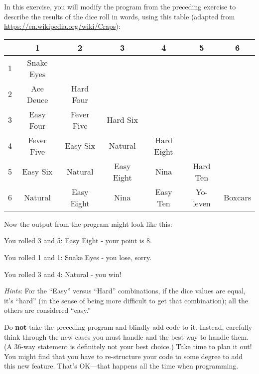 \begin{exercise}
In this exercise, you will modify the program from the preceding exercise to describe the results of the dice roll in words, using this table (adapted from \url{https://en.wikipedia.org/wiki/Craps}):

\begin{tabular}{|l|c|c|c|c|c|c|}
\hline
& 1 & 2 & 3 & 4 & 5 & 6 \\ \hline
1 & Snake Eyes & & & & & \\ \hline
2 & Ace Deuce & Hard Four & & & & \\ \hline
3 & Easy Four & Fever Five & Hard Six & & & \\ \hline
4 & Fever Five & Easy Six & Natural & Hard Eight & & \\ \hline
5 & Easy Six & Natural & Easy Eight & Nina & Hard Ten  & \\ \hline
6 & Natural & Easy Eight & Nina & Easy Ten & Yo-leven & Boxcars \\ \hline
\end{tabular}

Now the output from the program might look like this:

\begin{stdout}
You rolled 3 and 5: Easy Eight - your point is 8.

You rolled 1 and 1: Snake Eyes - you lose, sorry.

You rolled 3 and 4: Natural - you win!
\end{stdout}

{\em Hints}: For the ``Easy'' versus ``Hard'' combinations, if the dice values are equal, it's ``hard'' (in the sense of being more difficult to get that combination); all the others are considered ``easy.''

Do {\bf not} take the preceding program and blindly add code to it. Instead, carefully think through the new cases you must handle and the best way to handle them. (A 36-way  statement is definitely not your best choice.) Take time to plan it out! You might find that you have to re-structure your code to some degree to add this new feature. That's OK---that happens all the time when programming.

\end{exercise}
